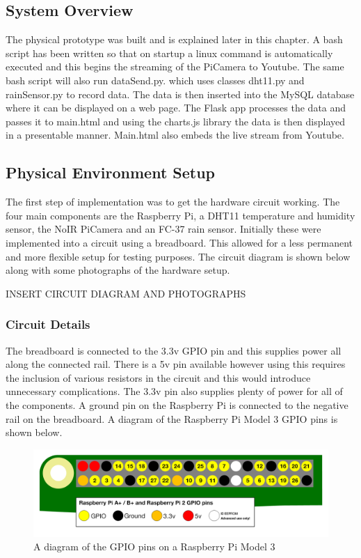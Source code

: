\documentclass[10pt,a4paper]{article}
\begin{document}
\subsection{System Overview}
The physical prototype was built and is explained later in this chapter. A bash script has been written so that on startup a linux command is automatically executed and this begins the streaming of the PiCamera to Youtube. The same bash script will also run dataSend.py. which uses classes dht11.py and rainSensor.py to record data. The data is then inserted into the MySQL database where it can be displayed on a web page. The Flask app processes the data and passes it to main.html and using the charts.js library the data is then displayed in a presentable manner. Main.html also embeds the live stream from Youtube. 

\subsection{Physical Environment Setup}
The first step of implementation was to get the hardware circuit working. The four main components are the Raspberry Pi, a DHT11 temperature and humidity sensor, the NoIR PiCamera and an FC-37 rain sensor. Initially these were implemented into a circuit using a breadboard. This allowed for a less permanent and more flexible setup for testing purposes. The circuit diagram is shown below along with some photographs of the hardware setup. 

INSERT CIRCUIT DIAGRAM AND PHOTOGRAPHS

\subsubsection{Circuit Details}
The breadboard is connected to the 3.3v GPIO pin and this supplies power all along the connected rail. There is a 5v pin available however using this requires the inclusion of various resistors in the circuit and this would introduce unnecessary complications. The 3.3v pin also supplies plenty of power for all of the components. A ground pin on the Raspberry Pi is connected to the negative rail on the breadboard. A diagram of the Raspberry Pi Model 3 GPIO pins is shown below. 
\begin{figure}[H]
  \centering
    \includegraphics[width=\linewidth]{images/gpio-pins.png}
    \caption{A diagram of the GPIO pins on a Raspberry Pi Model 3}
    \label{fig:gpiopins}
  \end{figure}
\end{document}
